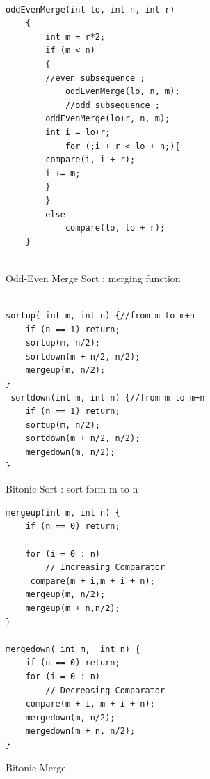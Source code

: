 \documentclass{acm_proc_article-sp}
\begin{document}
\begin{figure}
\begin{lstlisting}[label = oemerge ]

oddEvenMerge(int lo, int n, int r)
    {
        int m = r*2;
        if (m < n)
        {
	    //even subsequence ;		
            oddEvenMerge(lo, n, m); 
            //odd subsequence ;
	    oddEvenMerge(lo+r, n, m); 
	    int i = lo+r;   
            for (;i + r < lo + n;){
		compare(i, i + r);
		i += m;
	    }
        }
        else
            compare(lo, lo + r);
    }


\end{lstlisting} 
\caption{Odd-Even Merge Sort : merging function}
\end{figure}

\begin{figure}
\begin{lstlisting}[label=bitsort]

sortup( int m, int n) {//from m to m+n
    if (n == 1) return;
    sortup(m, n/2);
    sortdown(m + n/2, n/2);
    mergeup(m, n/2);
}
 sortdown(int m, int n) {//from m to m+n
    if (n == 1) return;
    sortup(m, n/2);
    sortdown(m + n/2, n/2);
    mergedown(m, n/2);
}
\end{lstlisting}
\caption{Bitonic Sort : sort form m to n}
\end{figure}

\begin{figure}[t]
\begin{lstlisting}[label=bitmerge]
mergeup(int m, int n) {  
    if (n == 0) return;
    
    for (i = 0 : n)
        // Increasing Comparator
	 compare(m + i,m + i + n);
    mergeup(m, n/2);
    mergeup(m + n,n/2);
}

mergedown( int m,  int n) { 
    if (n == 0) return;
    for (i = 0 : n) 
        // Decreasing Comparator
	compare(m + i, m + i + n); 
    mergedown(m, n/2);
    mergedown(m + n, n/2);
}
\end{lstlisting}
\caption{Bitonic Merge} 
\end{figure} 


%
%
\balancecolumns
\end{document}
